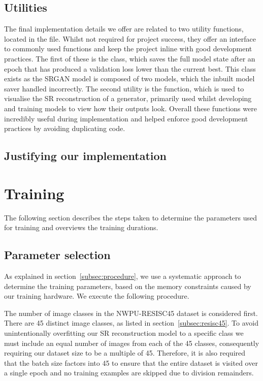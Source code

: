 \subsection{Utilities}
The final implementation details we offer are related to two utility functions, located in the  file. Whilst not required for project success, they offer an interface to commonly used functions and keep the project inline with good development practices. The first of these is the  class, which saves the full model state after an epoch that has produced a validation loss lower than the current best. This class exists as the SRGAN model is composed of two models, which the inbuilt  model saver handled incorrectly. The second utility is the  function, which is used to visualise the SR reconstruction of a generator, primarily used whilst developing and training models to view how their outputs look. Overall these functions were incredibly useful during implementation and helped enforce good development practices by avoiding duplicating code.

\subsection{Justifying our implementation}

\section{Training}
The following section describes the steps taken to determine the parameters used for training and overviews the training durations.

\subsection{Parameter selection}\label{subsec:parameter_selection}
As explained in section~\ref{subsec:procedure}, we use a systematic approach to determine the training parameters, based on the memory constraints caused by our training hardware. We execute the following procedure.

The number of image classes in the NWPU-RESISC45 dataset is considered first. There are 45 distinct image classes, as listed in section~\ref{subsec:resisc45}. To avoid unintentionally overfitting our SR reconstruction model to a specific class we must include an equal number of images from each of the 45 classes, consequently requiring our dataset size to be a multiple of 45. Therefore, it is also required that the batch size factors into 45 to ensure that the entire dataset is visited over a single epoch and no training examples are skipped due to division remainders.

